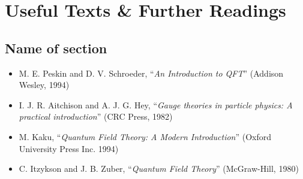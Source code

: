 \chapter*{Useful Texts \& Further Readings}

\section*{Name of section}
\begin{itemize}
    \item M. E. Peskin and D. V. Schroeder, “\textit{An Introduction to QFT}” (Addison Wesley, 1994)
    \item I. J. R. Aitchison and A. J. G. Hey, “\textit{Gauge theories in particle physics: A practical introduction}” (CRC Press, 1982) 
    \item M. Kaku, “\textit{Quantum Field Theory: A Modern Introduction}” (Oxford University Press Inc. 1994)
    \item C. Itzykson and J. B. Zuber, “\textit{Quantum Field Theory}” (McGraw-Hill, 1980)
\end{itemize}

